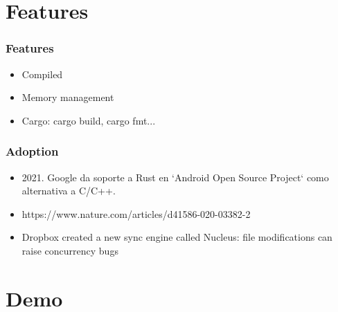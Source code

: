 \documentclass{beamer}
\begin{document}
\section{Features}

\begin{frame}
\frametitle{Features}

\begin{itemize}
\item Compiled
\item Memory management
\item Cargo: cargo build, cargo fmt...
\end{itemize}

\end{frame}

\begin{frame}
\frametitle{Adoption}
\begin{itemize}
\item 2021. Google da soporte a Rust en `Android Open Source Project` como alternativa a C/C++.
\item https://www.nature.com/articles/d41586-020-03382-2
\item Dropbox created a new sync engine called Nucleus: file modifications can raise concurrency bugs
\end{itemize}

\end{frame}

\section{Demo}
\end{document}
